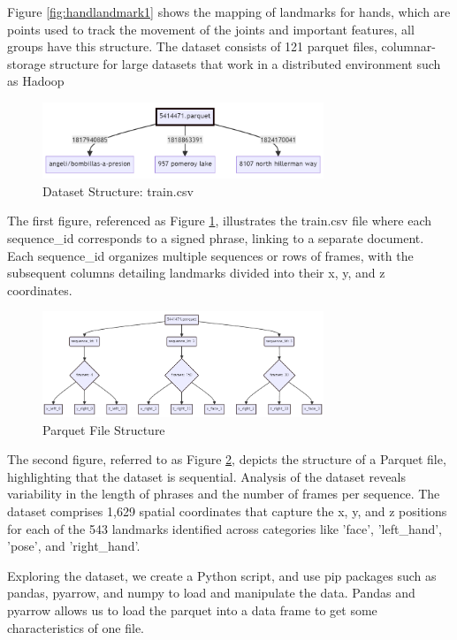 \documentclass[preprint,11pt,review,authoryear]{elsarticle}
\begin{document}
Figure \ref{fig:handlandmark1} shows the mapping of landmarks for hands, which are points used to track the movement of the joints and important features, all groups have this structure. The dataset consists of 121 parquet files, columnar-storage structure for large datasets that work in a distributed environment such as Hadoop

\begin{figure}[h]
    \centering
    \includegraphics[width=0.75\textwidth]{images/parquet_structure_1.png}
    \caption{Dataset Structure: train.csv}
    \label{fig:datastructure1}
\end{figure}

The first figure, referenced as Figure \ref{fig:datastructure1}, illustrates the train.csv file where each sequence\_id corresponds to a signed phrase, linking to a separate document. Each sequence\_id organizes multiple sequences or rows of frames, with the subsequent columns detailing landmarks divided into their x, y, and z coordinates.

\begin{figure}[h]
    \centering
    \includegraphics[width=0.75\textwidth]{images/parquet_structure_2.png}
    \caption{Parquet File Structure}
    \label{fig:datastructure2}
\end{figure}

The second figure, referred to as Figure \ref{fig:datastructure2}, depicts the structure of a Parquet file, highlighting that the dataset is sequential. Analysis of the dataset reveals variability in the length of phrases and the number of frames per sequence. The dataset comprises 1,629 spatial coordinates that capture the x, y, and z positions for each of the 543 landmarks identified across categories like 'face', 'left\_hand', 'pose', and 'right\_hand'.

Exploring the dataset, we create a Python script, and use pip packages such as pandas, pyarrow, and numpy to load and manipulate the data. Pandas and pyarrow allows us to load the parquet into a data frame to get some characteristics of one file.
\end{document}
